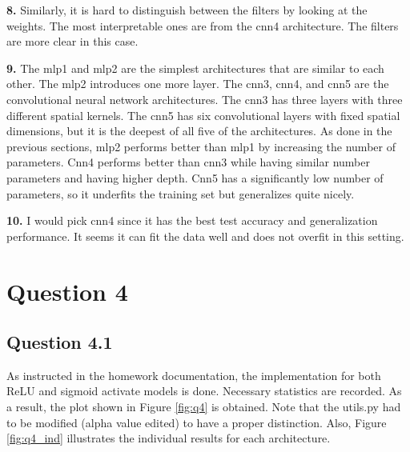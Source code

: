 \documentclass{assignment}
\begin{document}
\textbf{8.}
\noindent Similarly, it is hard to distinguish between the filters by looking at the weights. The most interpretable ones are from the cnn4 architecture. The filters are more clear in this case.

\textbf{9.}
\noindent The mlp1 and mlp2 are the simplest architectures that are similar to each other. The mlp2 introduces one more layer. The cnn3, cnn4, and cnn5 are the convolutional neural network architectures. The cnn3 has three layers with three different spatial kernels. The cnn5 has six convolutional layers with fixed spatial dimensions, but it is the deepest of all five of the architectures. As done in the previous sections, mlp2 performs better than mlp1 by increasing the number of parameters. Cnn4 performs better than cnn3 while having similar number parameters and having higher depth. Cnn5 has a significantly low number of parameters, so it underfits the training set but generalizes quite nicely.

\textbf{10.}
\noindent I would pick cnn4 since it has the best test accuracy and generalization performance. It seems it can fit the data well and does not overfit in this setting.

\section{Question 4}

\subsection*{Question 4.1}
As instructed in the homework documentation, the implementation for both ReLU and sigmoid activate models is done. Necessary statistics are recorded. As a result, the plot shown in Figure \ref{fig:q4} is obtained. Note that the utils.py had to be modified (alpha value edited) to have a proper distinction. Also, Figure \ref{fig:q4_ind} illustrates the individual results for each architecture.
\end{document}

